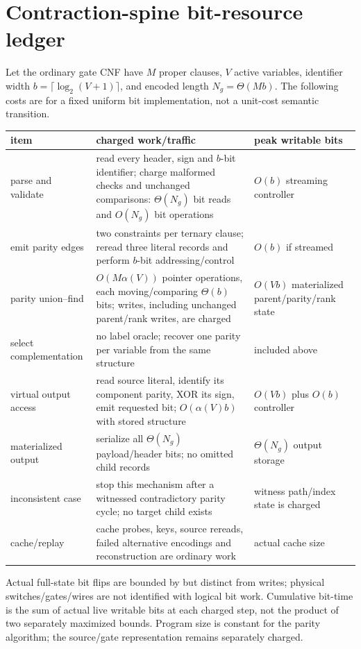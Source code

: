 \documentclass[11pt]{article}
\begin{document}
\section{Contraction-spine bit-resource ledger}
Let the ordinary gate CNF have $M$ proper clauses, $V$ active variables, identifier width $b=\lceil\log_2(V+1)\rceil$, and encoded length $N_g=\Theta(Mb)$.  The following costs are for a fixed uniform bit implementation, not a unit-cost semantic transition.
\begin{longtable}{p{}p{}p{}}
\toprule
item & charged work/traffic & peak writable bits\\
\midrule
parse and validate & read every header, sign and $b$-bit identifier; charge malformed checks and unchanged comparisons: $\Theta(N_g)$ bit reads and $O(N_g)$ bit operations & $O(b)$ streaming controller\\
emit parity edges & two constraints per ternary clause; reread three literal records and perform $b$-bit addressing/control & $O(b)$ if streamed\\
parity union--find & $O(M\alpha(V))$ pointer operations, each moving/comparing $\Theta(b)$ bits; writes, including unchanged parent/rank writes, are charged & $O(Vb)$ materialized parent/parity/rank state\\
select complementation & no label oracle; recover one parity per variable from the same structure & included above\\
virtual output access & read source literal, identify its component parity, XOR its sign, emit requested bit; $O(\alpha(V)b)$ with stored structure & $O(Vb)$ plus $O(b)$ controller\\
materialized output & serialize all $\Theta(N_g)$ payload/header bits; no omitted child records & $\Theta(N_g)$ output storage\\
inconsistent case & stop this mechanism after a witnessed contradictory parity cycle; no target child exists & witness path/index state is charged\\
cache/replay & cache probes, keys, source rereads, failed alternative encodings and reconstruction are ordinary work & actual cache size\\
\bottomrule
\end{longtable}
Actual full-state bit flips are bounded by but distinct from writes; physical switches/gates/wires are not identified with logical bit work.  Cumulative bit-time is the sum of actual live writable bits at each charged step, not the product of two separately maximized bounds.  Program size is constant for the parity algorithm; the source/gate representation remains separately charged.
\end{document}

